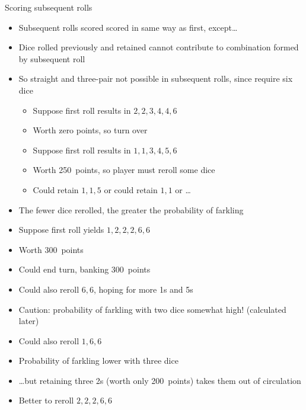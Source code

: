 \documentclass[handout]{beamer}
\theoremstyle{definition}
\begin{document}
\begin{frame}{Scoring subsequent rolls}
\begin{itemize}
\item Subsequent rolls scored scored in same way as first,
except\dots
\item Dice rolled previously and retained cannot
contribute to combination formed by subsequent roll
\item So straight and three-pair not possible in subsequent
rolls, since require six dice
\begin{example}
\begin{itemize}
\item Suppose first roll results in $2,2,3,4,4,6$
\item Worth zero points, so turn over
\end{itemize}
\end{example}
\begin{example}
\begin{itemize}
\item Suppose first roll results in $1,1,3,4,5,6$
\item Worth 250~points, so player must reroll \alert{some}
dice
\item Could retain $1,1,5$ or could
retain $1,1$ or \dots
\end{itemize}
\end{example}
\item The fewer dice rerolled, the greater
the probability of farkling
\end{itemize}
\end{frame}

\begin{frame}
\begin{example}
\begin{itemize}
\item Suppose first roll yields $1,2,2,2,6,6$
\item Worth 300~points
\item Could end turn, banking 300~points
\item Could also reroll $6,6$, hoping for more 1s and 5s
\item \alert{Caution:}
probability of farkling with two dice somewhat high!
(calculated later)
\item Could also reroll $1,6,6$
\item Probability of farkling lower with three dice
\item \dots but retaining three 2s 
(worth only 200~points)
takes them out of circulation
\item Better to reroll $2,2,2,6,6$
\end{itemize}
\end{example}
\end{frame}
\end{document}
